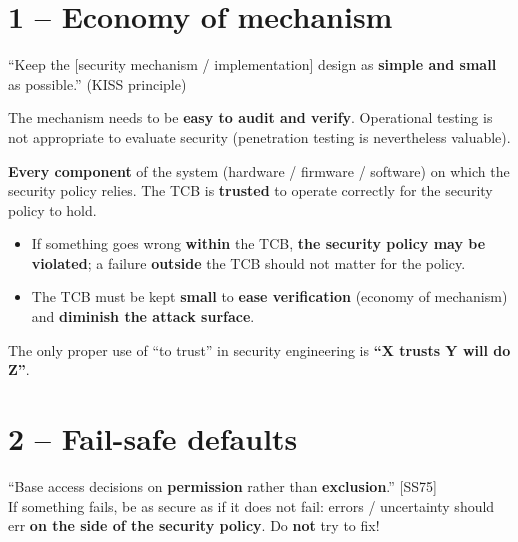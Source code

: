 \section{1 -- Economy of mechanism}

\begin{defnbox}[title=Economy of mechanism]
``Keep the [security mechanism / implementation] design as \textbf{simple and small}
as possible.'' (KISS principle)
\end{defnbox}

\begin{rembox}[title=Why?]
The mechanism needs to be \textbf{easy to audit and verify}. Operational testing is not
appropriate to evaluate security (penetration testing is nevertheless valuable).
\end{rembox}

\begin{defnbox}[title=Trusted Computing Base (TCB)]
\textbf{Every component} of the system (hardware / firmware / software) on which the
security policy relies. The TCB is \textbf{trusted} to operate correctly for the
security policy to hold.
\end{defnbox}

\begin{propbox}[title=Consequences of the TCB]
\begin{itemize}
  \item If something goes wrong \textbf{within} the TCB, \textbf{the security policy
        may be violated}; a failure \textbf{outside} the TCB should not matter for the
        policy.
  \item The TCB must be kept \textbf{small} to \textbf{ease verification} (economy of
        mechanism) and \textbf{diminish the attack surface}.
\end{itemize}
\end{propbox}

\begin{warnbox}[title=The verb ``to trust'']
The only proper use of ``to trust'' in security engineering is
\textbf{``X trusts Y will do Z''}.
\end{warnbox}

\section{2 -- Fail-safe defaults}

\begin{defnbox}[title=Fail-safe defaults]
``Base access decisions on \textbf{permission} rather than \textbf{exclusion}.'' [SS75]
\\
If something fails, be as secure as if it does not fail: errors / uncertainty should
err \textbf{on the side of the security policy}. Do \textbf{not} try to fix!
\end{defnbox}

